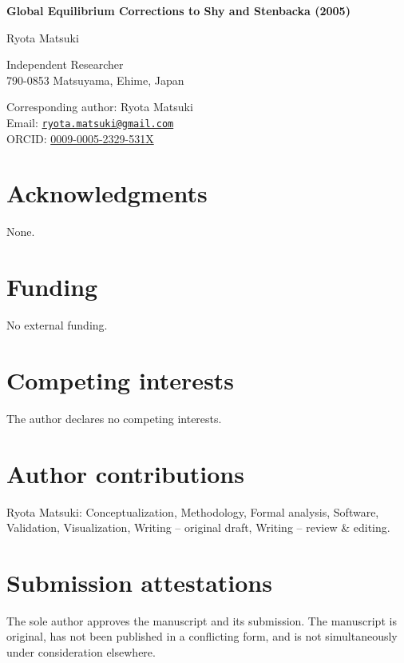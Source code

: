 \documentclass[11pt]{article}
\begin{document}
\begin{center}
{\Large\bfseries Global Equilibrium Corrections to Shy and Stenbacka (2005)\par}

\vspace{1.5em}

{\large Ryota Matsuki\par}
Independent Researcher\\
790-0853 Matsuyama, Ehime, Japan

\vspace{1em}

Corresponding author: Ryota Matsuki\\
Email: \href{mailto:ryota.matsuki@gmail.com}{\texttt{ryota.matsuki@gmail.com}}\\
ORCID: \href{https://orcid.org/0009-0005-2329-531X}{0009-0005-2329-531X}
\end{center}

\section*{Acknowledgments}
None.

\section*{Funding}
No external funding.

\section*{Competing interests}
The author declares no competing interests.

\section*{Author contributions}
Ryota Matsuki: Conceptualization, Methodology, Formal analysis, Software, Validation, Visualization, Writing -- original draft, Writing -- review \& editing.

\section*{Submission attestations}
The sole author approves the manuscript and its submission. The manuscript is original, has not been published in a conflicting form, and is not simultaneously under consideration elsewhere.
\end{document}
